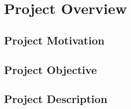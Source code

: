 \chapter{Project Overview}
\label{chapter:project}


\section{Project Motivation}
\label{sec:project-motivation}

\section{Project Objective}
\label{sec:project-objective}

\section{Project Description}
\label{sec:project-description}
